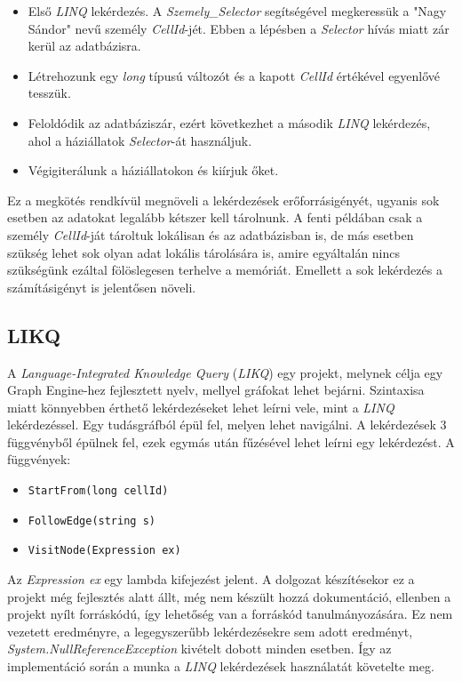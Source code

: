 \begin{itemize}
	\item Első \emph{LINQ} lekérdezés. A \emph{Szemely\_Selector} segítségével megkeressük a "Nagy Sándor" nevű személy \emph{CellId}-jét. Ebben a lépésben a \emph{Selector} hívás miatt zár kerül az adatbázisra.
	\item Létrehozunk egy \emph{long} típusú változót és a kapott \emph{CellId} értékével egyenlővé tesszük.
	\item Feloldódik az adatbáziszár, ezért következhet a második \emph{LINQ} lekérdezés, ahol a háziállatok \emph{Selector}-át használjuk.
	\item Végigiterálunk a háziállatokon és kiírjuk őket.
\end{itemize}

Ez a megkötés rendkívül megnöveli a lekérdezések erőforrásigényét, ugyanis sok esetben az adatokat legalább kétszer kell tárolnunk. A fenti példában csak a személy \emph{CellId}-ját tároltuk lokálisan és az adatbázisban is, de más esetben szükség lehet sok olyan adat lokális tárolására is, amire egyáltalán nincs szükségünk ezáltal fölöslegesen terhelve a memóriát. Emellett a sok lekérdezés a számításigényt is jelentősen növeli.

\subsection{LIKQ}

A \emph{Language-Integrated Knowledge Query} (\emph{LIKQ}) egy projekt, melynek célja egy Graph Engine-hez fejlesztett nyelv, mellyel gráfokat lehet bejárni. Szintaxisa miatt könnyebben érthető lekérdezéseket lehet leírni vele, mint a \emph{LINQ} lekérdezéssel. Egy tudásgráfból épül fel, melyen lehet navigálni. A lekérdezések 3 függvényből épülnek fel, ezek egymás után fűzésével lehet leírni egy lekérdezést. A függvények:

\begin{itemize}
	\item \texttt{StartFrom(long cellId)}
	\item \texttt{FollowEdge(string s)}
	\item \texttt{VisitNode(Expression ex)}
\end{itemize}

Az \emph{Expression ex} egy lambda kifejezést jelent.\cite{Lambda} A dolgozat készítésekor ez a projekt még fejlesztés alatt állt, még nem készült hozzá dokumentáció, ellenben a projekt nyílt forráskódú, így lehetőség van a forráskód tanulmányozására. Ez nem vezetett eredményre, a legegyszerűbb lekérdezésekre sem adott eredményt, \emph{System.NullReferenceException} kivételt dobott minden esetben. Így az implementáció során a munka a \emph{LINQ} lekérdezések használatát követelte meg.